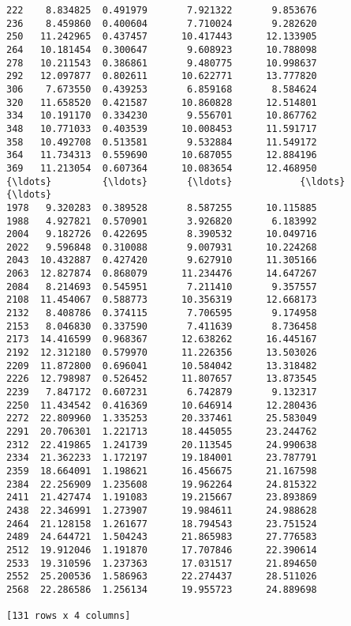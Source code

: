 \documentclass[11pt]{article}
\begin{document}
\begin{Verbatim}[commandchars=\\\{\}]
222    8.834825  0.491979       7.921322       9.853676
236    8.459860  0.400604       7.710024       9.282620
250   11.242965  0.437457      10.417443      12.133905
264   10.181454  0.300647       9.608923      10.788098
278   10.211543  0.386861       9.480775      10.998637
292   12.097877  0.802611      10.622771      13.777820
306    7.673550  0.439253       6.859168       8.584624
320   11.658520  0.421587      10.860828      12.514801
334   10.191170  0.334230       9.556701      10.867762
348   10.771033  0.403539      10.008453      11.591717
358   10.492708  0.513581       9.532884      11.549172
364   11.734313  0.559690      10.687055      12.884196
369   11.213054  0.607364      10.083654      12.468950
{\ldots}         {\ldots}       {\ldots}            {\ldots}            {\ldots}
1978   9.320283  0.389528       8.587255      10.115885
1988   4.927821  0.570901       3.926820       6.183992
2004   9.182726  0.422695       8.390532      10.049716
2022   9.596848  0.310088       9.007931      10.224268
2043  10.432887  0.427420       9.627910      11.305166
2063  12.827874  0.868079      11.234476      14.647267
2084   8.214693  0.545951       7.211410       9.357557
2108  11.454067  0.588773      10.356319      12.668173
2132   8.408786  0.374115       7.706595       9.174958
2153   8.046830  0.337590       7.411639       8.736458
2173  14.416599  0.968367      12.638262      16.445167
2192  12.312180  0.579970      11.226356      13.503026
2209  11.872800  0.696041      10.584042      13.318482
2226  12.798987  0.526452      11.807657      13.873545
2239   7.847172  0.607231       6.742879       9.132317
2250  11.434542  0.416369      10.646914      12.280436
2272  22.809960  1.335253      20.337461      25.583049
2291  20.706301  1.221713      18.445055      23.244762
2312  22.419865  1.241739      20.113545      24.990638
2334  21.362233  1.172197      19.184001      23.787791
2359  18.664091  1.198621      16.456675      21.167598
2384  22.256909  1.235608      19.962264      24.815322
2411  21.427474  1.191083      19.215667      23.893869
2438  22.346991  1.273907      19.984611      24.988628
2464  21.128158  1.261677      18.794543      23.751524
2489  24.644721  1.504243      21.865983      27.776583
2512  19.912046  1.191870      17.707846      22.390614
2533  19.310596  1.237363      17.031517      21.894650
2552  25.200536  1.586963      22.274437      28.511026
2568  22.286586  1.256134      19.955723      24.889698

[131 rows x 4 columns]

    \end{Verbatim}
\end{document}
